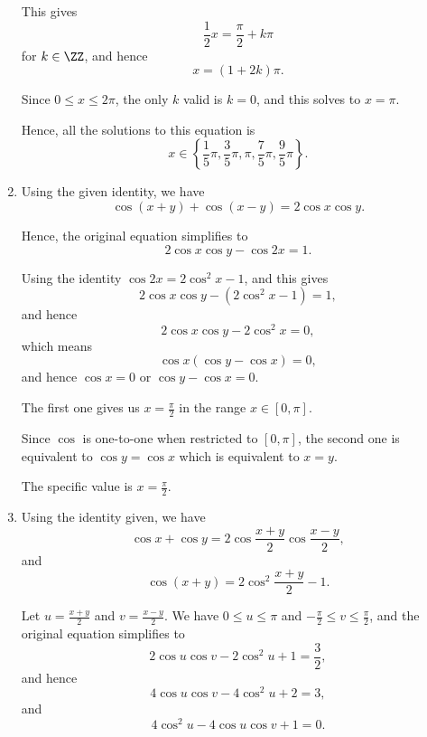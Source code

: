 \begin{enumerate}
          This gives
          \[
              \frac{1}{2}x = \frac{\pi}{2} + k\pi
          \]
          for \(k \in \ZZ\), and hence
          \[
              x = (1 + 2k) \pi.
          \]

          Since \(0 \leq x \leq 2\pi\), the only \(k\) valid is \(k = 0\), and this solves to \(x = \pi\).

          Hence, all the solutions to this equation is
          \[
              x \in \left\{\frac{1}{5} \pi, \frac{3}{5} \pi, \pi, \frac{7}{5} \pi, \frac{9}{5}\pi\right\}.
          \]

    \item Using the given identity, we have
          \[
              \cos (x + y) + \cos (x - y) = 2 \cos x \cos y.
          \]

          Hence, the original equation simplifies to
          \[
              2 \cos x \cos y - \cos 2x = 1.
          \]

          Using the identity \(\cos 2x = 2 \cos^2 x - 1\), and this gives
          \[
              2 \cos x \cos y - (2 \cos^2 x - 1) = 1,
          \]
          and hence
          \[
              2 \cos x \cos y - 2 \cos^2 x = 0,
          \]
          which means
          \[
              \cos x (\cos y - \cos x) = 0,
          \]
          and hence \(\cos x = 0\) or \(\cos y - \cos x = 0\).

          The first one gives us \(x = \frac{\pi}{2}\) in the range \(x \in [0, \pi]\).

          Since \(\cos\) is one-to-one when restricted to \([0, \pi]\), the second one is equivalent to \(\cos y = \cos x\) which is equivalent to \(x = y\).

          The specific value is \(x = \frac{\pi}{2}\).

    \item Using the identity given, we have
          \[
              \cos x + \cos y = 2 \cos \frac{x + y}{2} \cos \frac{x - y}{2},
          \]
          and
          \[
              \cos (x + y) = 2 \cos^2 \frac{x + y}{2} - 1.
          \]

          Let \(u = \frac{x + y}{2}\) and \(v = \frac{x - y}{2}\). We have \(0 \leq u \leq \pi\) and \(-\frac{\pi}{2} \leq v \leq \frac{\pi}{2}\), and the original equation simplifies to
          \[
              2 \cos u \cos v - 2 \cos^2 u + 1 = \frac{3}{2},
          \]
          and hence
          \[
              4 \cos u \cos v - 4 \cos^2 u + 2 = 3,
          \]
          and
          \[
              4 \cos^2 u - 4 \cos u \cos v + 1 = 0.
          \]


\end{enumerate}
